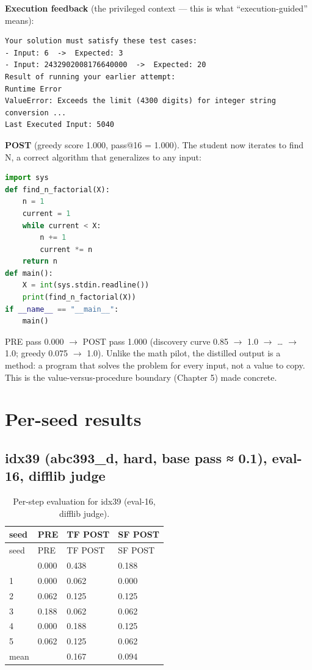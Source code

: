 \textbf{Execution feedback} (the privileged context --- this is what ``execution-guided'' means):

\begin{lstlisting}
Your solution must satisfy these test cases:
- Input: 6  ->  Expected: 3
- Input: 2432902008176640000  ->  Expected: 20
Result of running your earlier attempt:
Runtime Error
ValueError: Exceeds the limit (4300 digits) for integer string conversion ...
Last Executed Input: 5040
\end{lstlisting}

\textbf{POST} (greedy score 1.000, pass@16 = 1.000). The student now iterates to find N, a correct algorithm that generalizes to any input:

\begin{lstlisting}[language=Python]
import sys
def find_n_factorial(X):
    n = 1
    current = 1
    while current < X:
        n += 1
        current *= n
    return n
def main():
    X = int(sys.stdin.readline())
    print(find_n_factorial(X))
if __name__ == "__main__":
    main()
\end{lstlisting}

PRE pass 0.000 $\rightarrow$ POST pass 1.000 (discovery curve 0.85 $\rightarrow$ 1.0 $\rightarrow$ \ldots{} $\rightarrow$ 1.0; greedy 0.075 $\rightarrow$ 1.0). Unlike the math pilot, the distilled output is a method: a program that solves the problem for every input, not a value to copy. This is the value-versus-procedure boundary (Chapter 5) made concrete.

\chapter{Per-seed results}\label{appendix-e-per-seed-results}

\section{idx39 (abc393\_d, hard, base pass ≈ 0.1), eval-16, difflib judge}\label{e.1-idx39-abc393_d-hard-base-pass-0.1-eval-16-difflib-judge}

\begin{longtable}{llll}
\caption{Per-step evaluation for idx39 (eval-16, difflib judge).}\\
\toprule
seed & PRE & TF POST & SF POST \\
\midrule
\endfirsthead
\toprule
seed & PRE & TF POST & SF POST \\
\midrule
\endhead
\bottomrule
\endfoot
0 & 0.000 & 0.438 & 0.188 \\
1 & 0.000 & 0.062 & 0.000 \\
2 & 0.062 & 0.125 & 0.125 \\
3 & 0.188 & 0.062 & 0.062 \\
4 & 0.000 & 0.188 & 0.125 \\
5 & 0.062 & 0.125 & 0.062 \\
mean & & 0.167 & 0.094 \\
\end{longtable}

